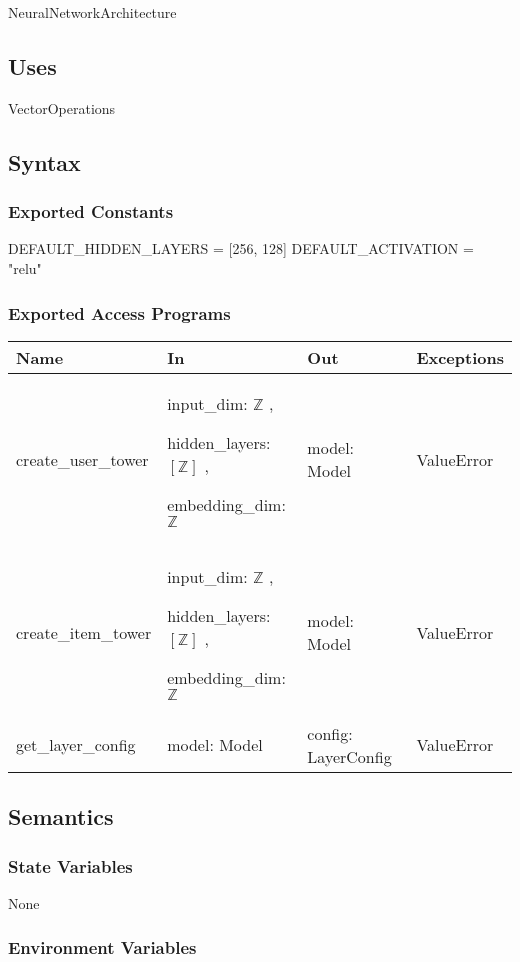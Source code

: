 \documentclass[12pt, titlepage]{article}
\begin{document}
NeuralNetworkArchitecture

\subsection{Uses}
VectorOperations

\subsection{Syntax}

\subsubsection{Exported Constants}
DEFAULT\_HIDDEN\_LAYERS = [256, 128]
DEFAULT\_ACTIVATION = "relu"
\subsubsection{Exported Access Programs}

\begin{center}
\begin{tabular}{p{4cm} p{4cm} p{4cm} p{2cm}}
\hline
\textbf{Name} & \textbf{In} & \textbf{Out} & \textbf{Exceptions} \\
\hline
create\_user\_tower & input\_dim: $\mathbb{Z}$ ,

hidden\_layers: $[\mathbb{Z}]$ ,

embedding\_dim: $\mathbb{Z}$ & model: Model & ValueError \\
\hline
create\_item\_tower & input\_dim: $\mathbb{Z}$ ,

hidden\_layers: $[\mathbb{Z}]$ ,

embedding\_dim: $\mathbb{Z}$ & model: Model & ValueError \\
\hline
get\_layer\_config & model: Model & config: LayerConfig & ValueError \\
\hline
\end{tabular}
\end{center}

\subsection{Semantics}

\subsubsection{State Variables}
None

\subsubsection{Environment Variables}
\end{document}
